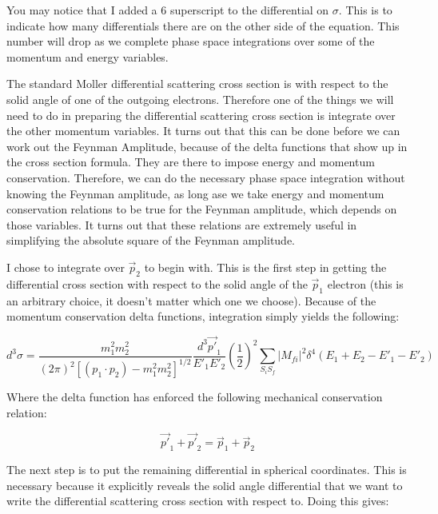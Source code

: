 \documentclass[a4]{article}
\begin{document}
    You may notice that I added a 6 superscript to the differential on $\sigma$. This is to indicate how many differentials there are on the other side of the equation. This number will drop as we complete
    phase space integrations over some of the momentum and energy variables.
    
    The standard Moller differential scattering cross section is with respect to the solid angle of one of the outgoing electrons. Therefore one of the things we will need to do in preparing the differential
    scattering cross section is integrate over the other momentum variables. It turns out that this can be done before we can work out the Feynman Amplitude, because of the delta functions that show up in
    the cross section formula. They are there to impose energy and momentum conservation. Therefore, we can do the necessary phase space integration without knowing the Feynman amplitude, as long ase we take
    energy and momentum conservation relations to be true for the Feynman amplitude, which depends on those variables. It turns out that these relations are extremely useful in simplifying the absolute square
    of the Feynman amplitude. 

    I chose to integrate over $\vec{p}_2$ to begin with. This is the first step in getting the differential cross section with respect to the solid angle of the $\vec{p}_1$ electron (this is an arbitrary choice,
    it doesn't matter which one we choose). Because of the momentum conservation delta functions, integration simply yields the following:

    \begin{equation}
        d^3 \sigma = \frac{m_1^2 m_2^2}{(2 \pi)^2 [(p_1 \cdot p_2) - m_1^2 m_2^2]^{1/2}} \frac{d^3 \vec{p'}_1}{E'_1 E'_2} (\frac{1}{2})^2 \sum_{S_i S_f} |M_{fi}|^2 \delta^4 (E_{1} + E_{2} - E'_{1} - E'_{2})
    \end{equation}

    Where the delta function has enforced the following mechanical conservation relation:

    \begin{equation}
        \vec{p'}_1 + \vec{p'}_2 = \vec{p}_1 + \vec{p}_2
    \end{equation}

    The next step is to put the remaining differential in spherical coordinates. This is necessary because it explicitly reveals the solid angle differential that we want to write the differential scattering
    cross section with respect to. Doing this gives:
\end{document}
